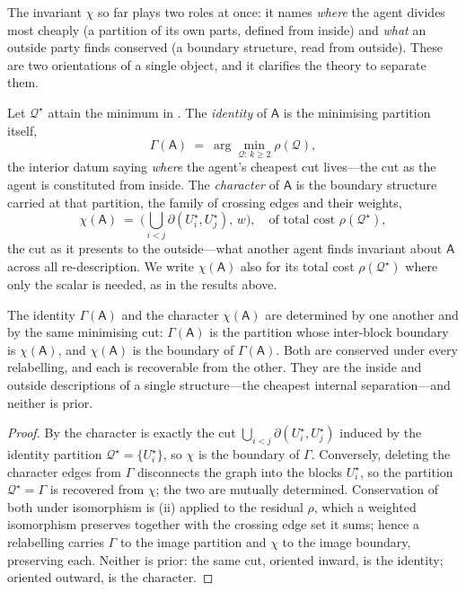 \documentclass[11pt,twocolumn,a4paper]{article}
\newcommand{\Agent}{\mathsf{A}}
\newcommand{\Self}{\Gamma}          %
\newcommand{\wt}{w}
\newcommand{\cut}{\partial}
\newcommand{\Char}{\chi}             %
\begin{document}
The invariant $\Char$ so far plays two roles at once: it names \emph{where}
the agent divides most cheaply (a partition of its own parts, defined from
inside) and \emph{what} an outside party finds conserved (a boundary
structure, read from outside). These are two orientations of a single
object, and it clarifies the theory to separate them.

\begin{definition}
\label{def:idchar}
Let $\mathcal{Q}^\star$ attain the minimum in . The
\emph{identity} of $\Agent$ is the minimising partition itself,
\[
\Self(\Agent)\ =\ \arg\min_{\mathcal{Q}:\,k\ge2}\rho(\mathcal{Q}),
\]
the interior datum saying \emph{where} the agent's cheapest cut lives---the
cut as the agent is constituted from inside. The \emph{character} of
$\Agent$ is the boundary structure carried at that partition, the family of
crossing edges and their weights,
\[
\Char(\Agent)\ =\ \bigl(\textstyle\bigcup_{i<j}\cut(U^\star_i,U^\star_j),\,
\wt\bigr),\quad\text{of total cost }\rho(\mathcal{Q}^\star),
\]
the cut as it presents to the outside---what another agent finds invariant
about $\Agent$ across all re-description. We write $\Char(\Agent)$ also for
its total cost $\rho(\mathcal{Q}^\star)$ where only the scalar is needed,
as in the results above.
\end{definition}

\begin{theorem}
\label{thm:idchar}
The identity $\Self(\Agent)$ and the character $\Char(\Agent)$ are
determined by one another and by the same minimising cut: $\Self(\Agent)$
is the partition whose inter-block boundary is $\Char(\Agent)$, and
$\Char(\Agent)$ is the boundary of $\Self(\Agent)$. Both are conserved
under every relabelling, and each is recoverable from the other. They are
the inside and outside descriptions of a single structure---the cheapest
internal separation---and neither is prior.
\end{theorem}

\begin{proof}
By  the character is exactly the cut $\bigcup_{i<j}
\cut(U^\star_i,U^\star_j)$ induced by the identity partition
$\mathcal{Q}^\star=\{U^\star_i\}$, so $\Char$ is the boundary of $\Self$.
Conversely, deleting the character edges from $\Self$ disconnects the graph
into the blocks $U^\star_i$, so the partition $\mathcal{Q}^\star=\Self$ is
recovered from $\Char$; the two are mutually determined. Conservation of
both under isomorphism is (ii) applied to the residual
$\rho$, which a weighted isomorphism preserves together with the crossing
edge set it sums; hence a relabelling carries $\Self$ to the image
partition and $\Char$ to the image boundary, preserving each. Neither is
prior: the same cut, oriented inward, is the identity; oriented outward, is
the character.
\end{proof}
\end{document}
